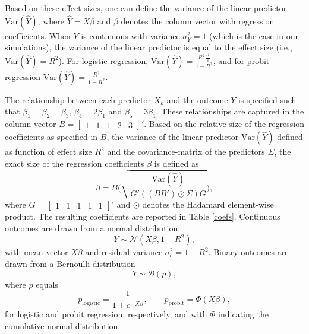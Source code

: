\documentclass[11pt,reqno]{article}
\begin{document}
\begin{appendices}
Based on these effect sizes, one can define the variance of the linear predictor $\text{Var}(\hat{Y})$, where $\hat{Y} = X\beta$ and $\beta$ denotes the column vector with regression coefficients.
When $Y$ is continuous with variance $\sigma^2_Y = 1$ (which is the case in our simulations), the variance of the linear predictor is equal to the effect size (i.e., $\text{Var}(\hat{Y}) = R^2$).
For logistic regression, $\text{Var}(\hat{Y}) = \frac{R^2 \frac{\pi^2}{3}}{1-R^2}$, and for probit regression $\text{Var}(\hat{Y}) = \frac{R^2}{1 - R^2}$.

The relationship between each predictor $X_k$ and the outcome $Y$ is specified such that $\beta_1 = \beta_2 = \beta_3$, $\beta_4 = 2\beta_1$ and $\beta_5 = 3\beta_1$.
These relationships are captured in the column vector $B = \begin{bmatrix} 1 & 1 & 1 & 2 & 3 \end{bmatrix}'$.
Based on the relative size of the regression coefficients as specified in $B$, the variance of the linear predictor $\text{Var}(\hat{Y})$ defined as function of effect size $R^2$ and the covariance-matrix of the predictors $\Sigma$, the exact size of the regression coefficients $\beta$ is defined as
\begin{equation}
\beta = B \Bigg(\sqrt{\frac{\text{Var}(\hat{Y})}{G' ((B B') \odot \Sigma) G }}\Bigg),
\end{equation}
where $G = \begin{bmatrix} 1 & 1 & 1 & 1 & 1 \end{bmatrix}'$ and $\odot$ denotes the Hadamard element-wise product. The resulting coefficients are reported in Table \ref{coefs}.
Continuous outcomes are drawn from a normal distribution
\begin{equation}
Y \sim \mathcal{N}(X\beta, 1 - R^2),
\end{equation}
with mean vector $X \beta$ and residual variance $\sigma_{\epsilon}^2 = 1 - R^2$.
Binary outcomes are drawn from a Bernoulli distribution
\begin{equation}
Y \sim \mathcal{B}(p),
\end{equation}
where $p$ equals
\begin{equation}
p_{\text{logistic}} = \frac{1}{1 + e^{-X\beta}},
~~~~~~~~~
p_{\text{probit}} = \Phi(X\beta),
\end{equation}
for logistic and probit regression, respectively, and with $\Phi$ indicating the cumulative normal distribution.


\end{appendices}
\end{document}
